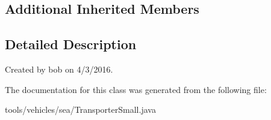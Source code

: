 \subsection*{Additional Inherited Members}


\subsection{Detailed Description}
Created by bob on 4/3/2016. 

The documentation for this class was generated from the following file\+:\begin{DoxyCompactItemize}
\item 
tools/vehicles/sea/Transporter\+Small.\+java\end{DoxyCompactItemize}
